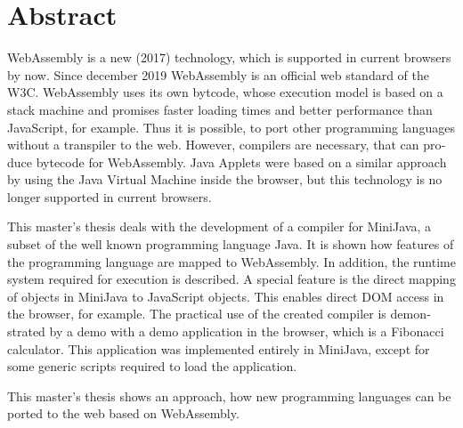 \chapter{Abstract}


\begin{english}
WebAssembly is a new (2017) technology, which is supported in current browsers by now. Since december 2019 WebAssembly is an official web standard of the W3C. Web\-As\-sem\-bly uses its own bytcode, whose execution model is based on a stack machine and promises faster loading times and better performance than JavaScript, for example. Thus it is possible, to port other programming languages without a transpiler to the web. However, compilers are necessary, that can produce bytecode for WebAssembly. Java Applets were based on a similar approach by using the Java Virtual Machine inside the browser, but this technology is no longer supported in current browsers.

This master's thesis deals with the development of a compiler for MiniJava, a subset of the well known programming language Java. It is shown how features of the programming language are mapped to WebAssembly. In addition, the runtime system required for execution is described. A special feature is the direct mapping of objects in MiniJava to JavaScript objects. This enables direct DOM access in the browser, for example. The practical use of the created compiler is demonstrated by a demo with a demo application in the browser, which is a Fibonacci calculator. This application was implemented entirely in MiniJava, except for some generic scripts required to load the application.

This master's thesis shows an approach, how new programming languages can be ported to the web based on WebAssembly.
\end{english}
